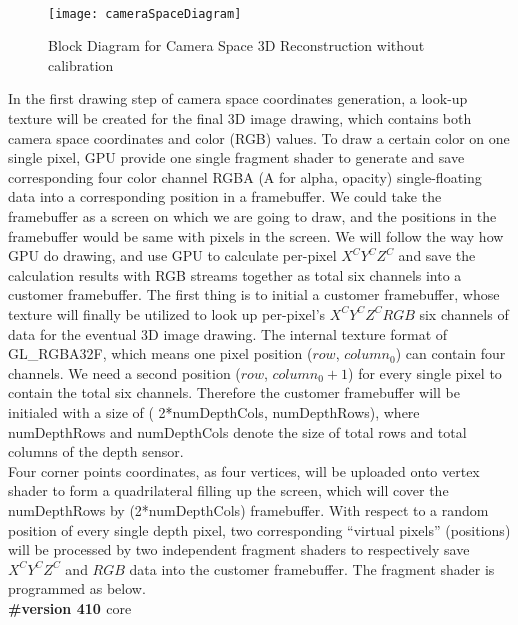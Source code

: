 \\\indent
%
\begin{figure}[!t]
\centering
\texttt{[image: cameraSpaceDiagram]}
\caption{Block Diagram for Camera Space 3D Reconstruction without calibration}
\label{cameraSpaceDiagram}
\end{figure}%
%
In the first drawing step of camera space coordinates generation, a look-up texture will be created for the final 3D image drawing, which contains both camera space coordinates and color (RGB) values. To draw a certain color on one single pixel, GPU provide one single fragment shader to generate and save corresponding four color channel RGBA (A for alpha, opacity) single-floating data into a corresponding position in a framebuffer. We could take the framebuffer as a screen on which we are going to draw, and the positions in the framebuffer would be same with pixels in the screen. We will follow the way how GPU do drawing, and use GPU to calculate per-pixel \(X^CY^CZ^C\) and save the calculation results with RGB streams together as total six channels into a customer framebuffer. The first thing is to initial a customer framebuffer, whose texture will finally be utilized to look up per-pixel's \(X^CY^CZ^CRGB\) six channels of data for the eventual 3D image drawing. The internal texture format of {\ttfamily\color[rgb]{0.0,0.0,0.5019608}GL\_RGBA32F}, which means one pixel position (\(row\), \(column_0\)) can contain four channels. We need a second position (\(row\), \(column_0 + 1\)) for every single pixel to contain the total six channels. Therefore the customer framebuffer will be initialed with a size of %
({\ttfamily
\textcolor[rgb]{0.0,0.0,0.5019608}{2}\textcolor{black}{*}\textcolor[rgb]{0.5019608,0.0,0.0}{numDepthCols}\textcolor{black}{,}\textcolor[rgb]{0.7529412,0.7529412,0.7529412}{
}\textcolor[rgb]{0.5019608,0.0,0.0}{numDepthRows}}),
where numDepthRows and numDepthCols denote the size of total rows and total columns of the depth sensor. %
\\\indent
Four corner points coordinates, as four vertices, will be uploaded onto vertex shader to form a quadrilateral filling up the screen, which will cover the numDepthRows by (2*numDepthCols) framebuffer. With respect to a random position of every single depth pixel, two corresponding \enquote{virtual pixels} (positions) will be processed by two independent fragment shaders to respectively save \(X^CY^CZ^C\) and \(RGB\) data into the customer framebuffer. The fragment shader is programmed as below.
\\%
%
%
{\ttfamily
\textbf{\textcolor[rgb]{0.5019608,0.0,0.5019608}{\#version }}\textcolor[rgb]{0.7529412,0.7529412,0.7529412}{
}\textbf{\textcolor[rgb]{0.5019608,0.0,0.5019608}{410 }}\textcolor[rgb]{0.7529412,0.7529412,0.7529412}{
}core}

